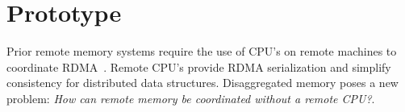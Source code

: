 




\section{Prototype}
Prior remote memory systems require the use of CPU's on remote
machines to coordinate RDMA~\cite{cell,sonuma,storm,erpc,farm}. Remote
CPU's provide RDMA serialization and simplify consistency for
distributed data structures. Disaggregated memory poses a new problem:
\textit{How can remote memory be coordinated without a remote CPU?}.

